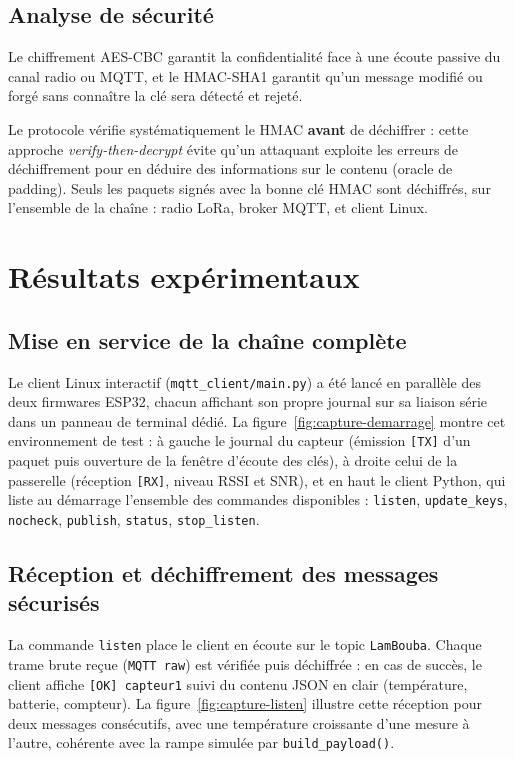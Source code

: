 \documentclass[a4paper,11pt]{report}
\begin{document}
\section{Analyse de sécurité}
\begin{validation}
Le chiffrement AES-CBC garantit la confidentialité face à une écoute passive du canal radio ou MQTT, et
le HMAC-SHA1 garantit qu'un message modifié ou forgé sans connaître la clé sera détecté et rejeté.
\end{validation}

\begin{validation}
Le protocole vérifie systématiquement le HMAC \textbf{avant} de déchiffrer : cette approche
\emph{verify-then-decrypt} évite qu'un attaquant exploite les erreurs de déchiffrement pour en déduire
des informations sur le contenu (oracle de padding). Seuls les paquets signés avec la bonne clé
HMAC sont déchiffrés, sur l'ensemble de la chaîne : radio LoRa, broker MQTT, et client Linux.
\end{validation}

\chapter{Résultats expérimentaux}
\label{chap:resultats}

\section{Mise en service de la chaîne complète}
Le client Linux interactif (\texttt{mqtt\_client/main.py}) a été lancé en parallèle des deux firmwares
ESP32, chacun affichant son propre journal sur sa liaison série dans un panneau de terminal dédié. La
figure~\ref{fig:capture-demarrage} montre cet environnement de test : à gauche le journal du capteur
(émission \texttt{[TX]} d'un paquet puis ouverture de la fenêtre d'écoute des clés), à droite celui de la
passerelle (réception \texttt{[RX]}, niveau RSSI et SNR), et en haut le client Python, qui liste au
démarrage l'ensemble des commandes disponibles : \texttt{listen}, \texttt{update\_keys}, \texttt{nocheck},
\texttt{publish}, \texttt{status}, \texttt{stop\_listen}.

\section{Réception et déchiffrement des messages sécurisés}
La commande \texttt{listen} place le client en écoute sur le topic \texttt{LamBouba}. Chaque trame brute
reçue (\texttt{MQTT raw}) est vérifiée puis déchiffrée : en cas de succès, le client affiche
\texttt{[OK] capteur1} suivi du contenu JSON en clair (température, batterie, compteur). La
figure~\ref{fig:capture-listen} illustre cette réception pour deux messages consécutifs, avec une
température croissante d'une mesure à l'autre, cohérente avec la rampe simulée par \texttt{build\_payload()}.
\end{document}
